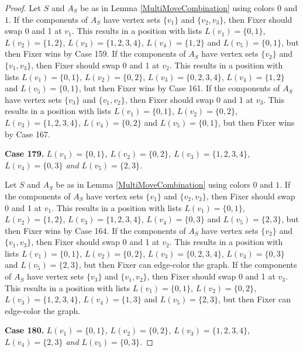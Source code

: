 \documentclass[12pt]{amsart}
\theoremstyle{plain}
\theoremstyle{definition}
\theoremstyle{remark}
\begin{document}
\begin{proof}
Let $S$ and $A_S$ be as in Lemma \ref{MultiMoveCombination} using colors $0$ and $1$. If the components of $A_S$ have vertex sets $\{v_1\}$ and $\{v_2, v_3\}$, then Fixer should swap 0 and 1 at $v_1$. This results in a position with lists $L(v_1) = \{0, 1\}$, $L(v_2) = \{1, 2\}$, $L(v_3) = \{1, 2, 3, 4\}$, $L(v_4) = \{1, 2\}$ and $L(v_5) = \{0, 1\}$, but then Fixer wins by Case 159. If the components of $A_S$ have vertex sets $\{v_2\}$ and $\{v_1, v_3\}$, then Fixer should swap 0 and 1 at $v_2$. This results in a position with lists $L(v_1) = \{0, 1\}$, $L(v_2) = \{0, 2\}$, $L(v_3) = \{0, 2, 3, 4\}$, $L(v_4) = \{1, 2\}$ and $L(v_5) = \{0, 1\}$, but then Fixer wins by Case 161. If the components of $A_S$ have vertex sets $\{v_3\}$ and $\{v_1, v_2\}$, then Fixer should swap 0 and 1 at $v_3$. This results in a position with lists $L(v_1) = \{0, 1\}$, $L(v_2) = \{0, 2\}$, $L(v_3) = \{1, 2, 3, 4\}$, $L(v_4) = \{0, 2\}$ and $L(v_5) = \{0, 1\}$, but then Fixer wins by Case 167. 

\noindent\textbf{Case 179.  }\textit{$L(v_1) = \{0, 1\}$, $L(v_2) = \{0, 2\}$, $L(v_3) = \{1, 2, 3, 4\}$, $L(v_4) = \{0, 3\}$ and $L(v_5) = \{2, 3\}$.}

Let $S$ and $A_S$ be as in Lemma \ref{MultiMoveCombination} using colors $0$ and $1$. If the components of $A_S$ have vertex sets $\{v_1\}$ and $\{v_2, v_3\}$, then Fixer should swap 0 and 1 at $v_1$. This results in a position with lists $L(v_1) = \{0, 1\}$, $L(v_2) = \{1, 2\}$, $L(v_3) = \{1, 2, 3, 4\}$, $L(v_4) = \{0, 3\}$ and $L(v_5) = \{2, 3\}$, but then Fixer wins by Case 164. If the components of $A_S$ have vertex sets $\{v_2\}$ and $\{v_1, v_3\}$, then Fixer should swap 0 and 1 at $v_2$. This results in a position with lists $L(v_1) = \{0, 1\}$, $L(v_2) = \{0, 2\}$, $L(v_3) = \{0, 2, 3, 4\}$, $L(v_4) = \{0, 3\}$ and $L(v_5) = \{2, 3\}$, but then Fixer can edge-color the graph. If the components of $A_S$ have vertex sets $\{v_3\}$ and $\{v_1, v_2\}$, then Fixer should swap 0 and 1 at $v_3$. This results in a position with lists $L(v_1) = \{0, 1\}$, $L(v_2) = \{0, 2\}$, $L(v_3) = \{1, 2, 3, 4\}$, $L(v_4) = \{1, 3\}$ and $L(v_5) = \{2, 3\}$, but then Fixer can edge-color the graph. 

\noindent\textbf{Case 180.  }\textit{$L(v_1) = \{0, 1\}$, $L(v_2) = \{0, 2\}$, $L(v_3) = \{1, 2, 3, 4\}$, $L(v_4) = \{2, 3\}$ and $L(v_5) = \{0, 3\}$.}


\end{proof}
\end{document}
